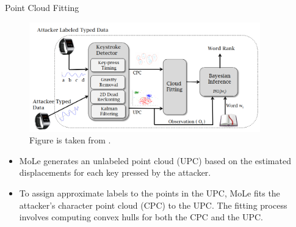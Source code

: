 \documentclass[ucs,9pt]{beamer}
\begin{document}
\begin{frame}{Point Cloud Fitting}
	\begin{figure}
		\centering
		\includegraphics[width=10cm]{imgs/moleOverview}
		\caption{Figure is taken from \cite{b1}.}
	\end{figure}
	\begin{itemize}
		\item MoLe generates an unlabeled point cloud (UPC) based on the estimated displacements for each key pressed by the attacker.
		\item To assign approximate labels to the points in the UPC, MoLe fits the attacker's character point cloud (CPC) to the UPC. The fitting process involves computing convex hulls for both the CPC and the UPC.
	\end{itemize}
\end{frame}
\end{document}
